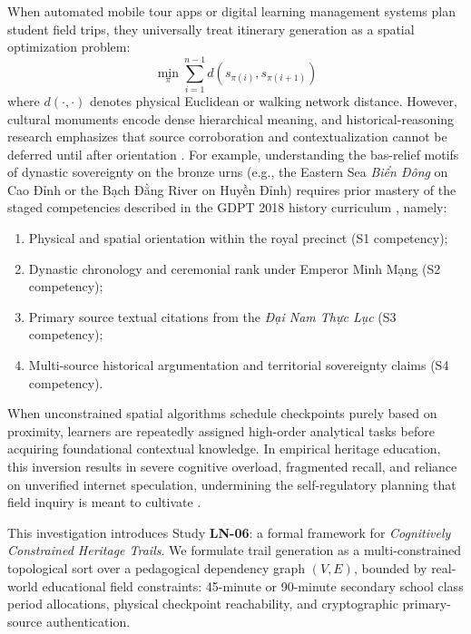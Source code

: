 \documentclass[11pt,a4paper]{article}
\begin{document}
When automated mobile tour apps or digital learning management systems plan student field trips, they universally treat itinerary generation as a spatial optimization problem:
\begin{equation}
\min_{\pi} \sum_{i=1}^{n-1} d(s_{\pi(i)}, s_{\pi(i+1)})
\end{equation}
where $d(\cdot, \cdot)$ denotes physical Euclidean or walking network distance. However, cultural monuments encode dense hierarchical meaning, and historical-reasoning research emphasizes that source corroboration and contextualization cannot be deferred until after orientation \cite{vanlehn2006behavior}. For example, understanding the bas-relief motifs of dynastic sovereignty on the bronze urns (e.g., the Eastern Sea \textit{Biển Đông} on Cao Đỉnh or the Bạch Đằng River on Huyền Đỉnh) requires prior mastery of the staged competencies described in the GDPT 2018 history curriculum \cite{moet2018gdpt}, namely:
\begin{enumerate}
    \item Physical and spatial orientation within the royal precinct (S1 competency);
    \item Dynastic chronology and ceremonial rank under Emperor Minh Mạng (S2 competency);
    \item Primary source textual citations from the \textit{Đại Nam Thực Lục} (S3 competency);
    \item Multi-source historical argumentation and territorial sovereignty claims (S4 competency).
\end{enumerate}

When unconstrained spatial algorithms schedule checkpoints purely based on proximity, learners are repeatedly assigned high-order analytical tasks before acquiring foundational contextual knowledge. In empirical heritage education, this inversion results in severe cognitive overload, fragmented recall, and reliance on unverified internet speculation, undermining the self-regulatory planning that field inquiry is meant to cultivate \cite{zimmerman2000self}.

This investigation introduces Study \textbf{LN-06}: a formal framework for \textit{Cognitively Constrained Heritage Trails}. We formulate trail generation as a multi-constrained topological sort over a pedagogical dependency graph $(V, E)$, bounded by real-world educational field constraints: 45-minute or 90-minute secondary school class period allocations, physical checkpoint reachability, and cryptographic primary-source authentication.
\end{document}
